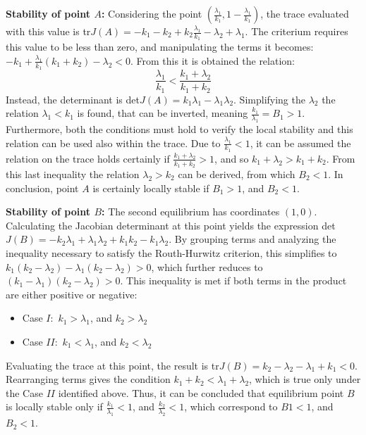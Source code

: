 \textbf{Stability of point $A$:} Considering the point $(\frac{\lambda_1}{k_1}, 1-\frac{\lambda_1}{k_1})$, the trace evaluated with this value is tr$J(A) = - k_1 - k_2 +k_2 \frac{\lambda_1}{k_1} - \lambda_2 + \lambda_1$. The criterium requires this value to be less than zero, and manipulating the terms it becomes: $-k_1 + \frac{\lambda_1}{k_1}( k_1 + k_2) - \lambda_2 < 0$. From this it is obtained the relation:
\[\frac{\lambda_1}{k_1} < \frac{k_1 + \lambda_2}{k_1 + k_2} \]
Instead, the determinant is det$J(A) = k_1 \lambda_1 - \lambda_1 \lambda_2$. Simplifying the $\lambda_2$ the relation $\lambda_1 < k_1$ is found, that can be inverted, meaning $\frac{k_1}{\lambda_1} = B_1 > 1$.
Furthermore, both the conditions must hold to verify the local stability and this relation can be used also within the trace. Due to $\frac{\lambda_1}{k_1} < 1$, it can be assumed the relation on the trace holds certainly if $\frac{k_1 + \lambda_2}{k_1 + k_2} > 1$, and so $k_1 + \lambda_2 > k_1 + k_2$. From this last inequality the relation $\lambda_2 > k_2$ can be derived, from which $B_2 < 1$. %
In conclusion, point $A$ is certainly locally stable if $B_1 > 1$, and $B_2 < 1$.  
 
\textbf{Stability of point $B$:} The second equilibrium has coordinates $(1,0)$. Calculating the Jacobian determinant at this point yields the expression det$J(B)= - k_2 \lambda_1 + \lambda_1 \lambda_2 + k_1 k_2 - k_1 \lambda_2$. By grouping terms and analyzing the inequality necessary to satisfy the Routh-Hurwitz criterion, this simplifies to $k_1 (k_2 - \lambda_2) - \lambda_1(k_2 - \lambda_2) > 0$, which further reduces to $(k_1 - \lambda_1) (k_2 - \lambda_2) >0$.
This inequality is met if both terms in the product are either positive or negative:
\begin{itemize}
	\item Case $I:$ $k_1 > \lambda_1$, and $k_2 > \lambda_2$
	\item Case $II:$ $k_1 < \lambda_1$, and $k_2 < \lambda_2$
\end{itemize}
Evaluating the trace at this point, the result is tr$J(B) = k_2 - \lambda_2 - \lambda_1 + k_1 < 0 $. Rearranging terms gives the condition $k_1 + k_2 < \lambda_1 + \lambda_2$, which is true only under the Case $II$ identified above. 
Thus, it can be concluded that equilibrium point $B$ is locally stable only if $\frac{k_1}{\lambda_1} <1$, and  $\frac{k_2}{\lambda_2} <1$, which correspond to $B1 < 1$, and $B_2 <1$.

